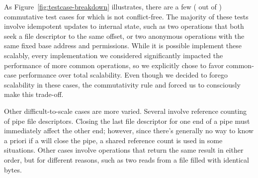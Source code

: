 As Figure~\ref{fig:testcase-breakdown} illustrates, there are a few
( out of )
commutative test cases for
which \fs is not conflict-free.
%
The majority of these tests involve idempotent updates to internal
state, such as two  operations that both seek a file
descriptor to the same offset, or two anonymous  operations
with the same fixed base address and permissions.  While it is
possible implement these scalably, every implementation we considered
significantly impacted the performance of more common operations, so
we explicitly chose to favor common-case performance over total
scalability.  Even though we decided to forego scalability in these
cases, the commutativity rule and \tool forced us to consciously make
this trade-off.
%


Other difficult-to-scale cases are more varied.  Several involve
reference counting of pipe file descriptors.  Closing the last file
descriptor for one end of a pipe must immediately affect the other
end; however, since there's generally no way to know a priori if a
 will close the pipe, a shared reference count is used in
some situations.  Other cases involve operations that return the same
result in either order, but for different reasons, such as two reads
from a file filled with identical bytes.


